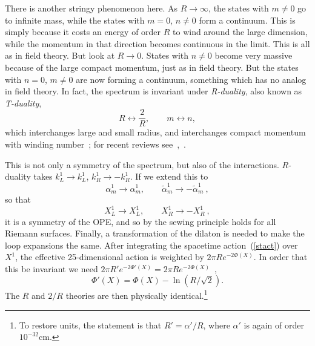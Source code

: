 There is another stringy phenomenon here.  As $R
\to \infty$, the states with $m \neq 0$ go to infinite mass, while
the states with $m = 0$, $n \neq 0$ form a continuum.  This is
simply because it costs an energy of order $R$ to wind around the
large dimension, while the momentum in that direction becomes
continuous in the limit.  This is all as in field theory.  But look
at $R \to 0$.  States with $n \neq 0$ become very massive because of
the large compact momentum, just as in field theory.  But the states
with $n= 0$, $m \neq 0$ are now forming a continuum, something
which has no analog in field theory.  In fact, the spectrum is
invariant under {\it R-duality}, also known as {\it T-duality},
\begin{equation}
R \leftrightarrow \frac{2}{R}, \qquad m \leftrightarrow n,
\end{equation}
which interchanges large and small radius, and interchanges compact
momentum with winding number~\cite{KY}; for recent
reviews see~\cite{GPR},~\cite{Tsdual}.

This is not only a symmetry of the spectrum, but also of the
interactions.  $R$-duality takes $k^{1}_L \to k^{1}_L$, $k^{1}_R
\to -k^{1}_R$.  If we extend this to
\begin{equation}
\alpha_m^{1} \to \alpha_m^{1},\qquad
\tilde\alpha_m^{1} \to - \tilde\alpha_m^{1} \ ,
\end{equation}
so that
\begin{equation}
X_L^{1} \to X_L^{1}, \qquad  X_R^{1} \to -X_R^{1}\ ,
\end{equation}
it is a symmetry of the OPE, and so by the sewing principle holds
for all Riemann surfaces.  Finally, a transformation of the dilaton
is needed to make the loop expansions the same.  After integrating
the spacetime action~(\ref{stact}) over $X^{1}$, the effective
25-dimensional action is weighted by $2\pi R e^{- 2\Phi(X)}$.  In
order that this be invariant we need $2\pi R' e^{- 2\Phi'(X)} =
2\pi R e^{- 2\Phi(X)}$~\cite{Busch},
\begin{equation}
\Phi'(X) = \Phi (X) - \ln(R/\sqrt{2}).
\end{equation}
The $R$ and $2/R$ theories are then physically
identical.\footnote{To restore units, the statement is that
$R' = \alpha'/R$, where $\alpha'$ is again of order
$10^{-32}$cm.}

